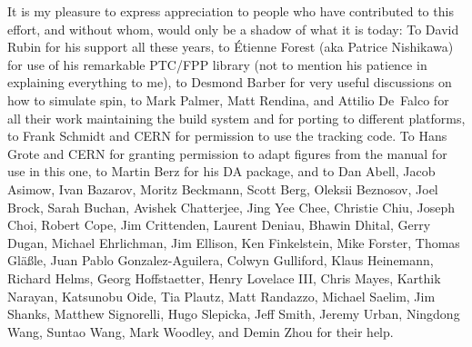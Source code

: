 It is my pleasure to express appreciation to people who have contributed to this effort, and without
whom, \bmad would only be a shadow of what it is today: To David Rubin for his support all these
years, to \'Etienne Forest (aka Patrice Nishikawa) for use of his remarkable PTC/FPP library (not to
mention his patience in explaining everything to me), to Desmond Barber for very useful discussions
on how to simulate spin, to Mark Palmer, Matt Rendina, and Attilio De~Falco for all their work
maintaining the build system and for porting \bmad to different platforms, to Frank Schmidt and CERN
for permission to use the \mad tracking code. To Hans Grote and CERN for granting permission to
adapt figures from the \mad manual for use in this one, to Martin Berz for his DA package, and to
Dan Abell, Jacob Asimow, Ivan Bazarov, Moritz Beckmann, Scott Berg, Oleksii Beznosov, Joel Brock,
Sarah Buchan, Avishek Chatterjee, Jing Yee Chee, Christie Chiu, Joseph Choi, Robert Cope, Jim
Crittenden, Laurent Deniau, Bhawin Dhital, Gerry Dugan, Michael Ehrlichman, Jim Ellison, Ken
Finkelstein, Mike Forster, Thomas Gl{\"a}{\ss}le, Juan Pablo Gonzalez-Aguilera, Colwyn Gulliford,
Klaus Heinemann, Richard Helms, Georg Hoffstaetter, Henry Lovelace III, Chris Mayes, Karthik
Narayan, Katsunobu Oide, Tia Plautz, Matt Randazzo, Michael Saelim, Jim Shanks, Matthew Signorelli,
Hugo Slepicka, Jeff Smith, Jeremy Urban, Ningdong Wang, Suntao Wang, Mark Woodley, and Demin Zhou
for their help.

